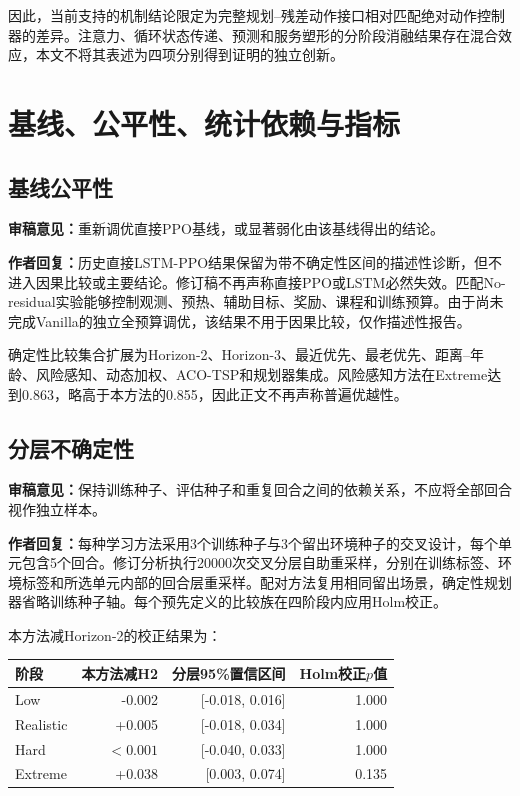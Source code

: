 \documentclass[UTF8,fontset=none]{ctexart}
\newcommand{\reviewcomment}[1]{\par\noindent\textbf{审稿意见：}#1\par}
\newcommand{\authorresponse}[1]{\par\noindent\textbf{作者回复：}#1\par}
\begin{document}
因此，当前支持的机制结论限定为完整规划--残差动作接口相对匹配绝对动作控制器的差异。注意力、循环状态传递、预测和服务塑形的分阶段消融结果存在混合效应，本文不将其表述为四项分别得到证明的独立创新。

\section{基线、公平性、统计依赖与指标}
\subsection{基线公平性}
\reviewcomment{重新调优直接PPO基线，或显著弱化由该基线得出的结论。}

\authorresponse{历史直接LSTM-PPO结果保留为带不确定性区间的描述性诊断，但不进入因果比较或主要结论。修订稿不再声称直接PPO或LSTM必然失效。匹配No-residual实验能够控制观测、预热、辅助目标、奖励、课程和训练预算。由于尚未完成Vanilla的独立全预算调优，该结果不用于因果比较，仅作描述性报告。}

确定性比较集合扩展为Horizon-2、Horizon-3、最近优先、最老优先、距离--年龄、风险感知、动态加权、ACO-TSP和规划器集成。风险感知方法在Extreme达到0.863，略高于本方法的0.855，因此正文不再声称普遍优越性。

\subsection{分层不确定性}
\reviewcomment{保持训练种子、评估种子和重复回合之间的依赖关系，不应将全部回合视作独立样本。}

\authorresponse{每种学习方法采用3个训练种子与3个留出环境种子的交叉设计，每个单元包含5个回合。修订分析执行20000次交叉分层自助重采样，分别在训练标签、环境标签和所选单元内部的回合层重采样。配对方法复用相同留出场景，确定性规划器省略训练种子轴。每个预先定义的比较族在四阶段内应用Holm校正。}

本方法减Horizon-2的校正结果为：
\begin{center}
\begin{tabular}{lrrr}
\toprule
阶段 & 本方法减H2 & 分层95\%置信区间 & Holm校正$p$值\\
\midrule
Low & -0.002 & [-0.018, 0.016] & 1.000\\
Realistic & +0.005 & [-0.018, 0.034] & 1.000\\
Hard & $<0.001$ & [-0.040, 0.033] & 1.000\\
Extreme & +0.038 & [0.003, 0.074] & 0.135\\
\bottomrule
\end{tabular}
\end{center}
\end{document}

